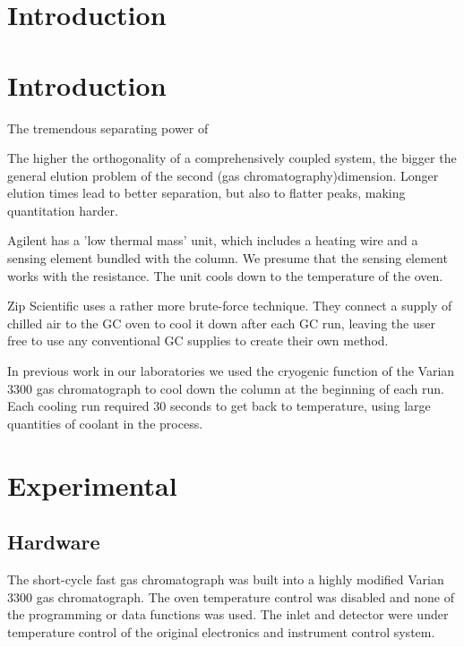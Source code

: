 \documentclass[aip,rsi,reprint,graphicx]{revtex4-1} %
\begin{document}
\section{Introduction}
\subsection{}
\subsubsection{}

\section{Introduction}

The tremendous separating power of 

The higher the orthogonality of a comprehensively coupled system, the bigger the general elution problem of the second (gas chromatography)dimension. Longer elution times lead to better separation, but also to flatter peaks, making quantitation harder. 

Agilent has a 'low thermal mass' unit, which includes a heating wire and a sensing element bundled with the column. We presume that the sensing element works with the resistance. The unit cools down to the temperature of the oven.

Zip Scientific uses a rather more brute-force technique. They connect a supply of chilled air to the GC oven to cool it down after each GC run, leaving the user free to use any conventional GC supplies to create their own method. 

In previous work in our laboratories we used the cryogenic function of the Varian 3300 gas chromatograph to cool down the column at the beginning of each run. Each cooling run required 30 seconds to get back to temperature, using large quantities of coolant in the process. 

\section{Experimental}

\subsection{Hardware}
The short-cycle fast gas chromatograph was built into a highly modified Varian 3300 gas chromatograph. The oven temperature control was disabled and none of the programming or data functions was used. The inlet and detector were under temperature control of the original electronics and instrument control system.
\end{document}
